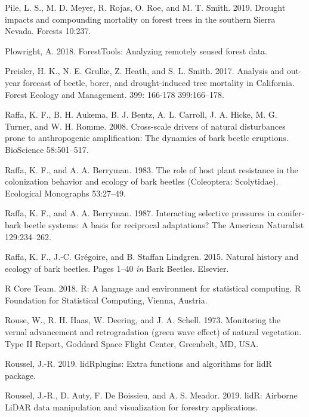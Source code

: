 \documentclass[]{article}
\begin{document}
\leavevmode\hypertarget{ref-pile2019}{}%
Pile, L. S., M. D. Meyer, R. Rojas, O. Roe, and M. T. Smith. 2019.
Drought impacts and compounding mortality on forest trees in the
southern Sierra Nevada. Forests 10:237.

\leavevmode\hypertarget{ref-plowright2018}{}%
Plowright, A. 2018. ForestTools: Analyzing remotely sensed forest data.

\leavevmode\hypertarget{ref-preisler2017}{}%
Preisler, H. K., N. E. Grulke, Z. Heath, and S. L. Smith. 2017. Analysis
and out-year forecast of beetle, borer, and drought-induced tree
mortality in California. Forest Ecology and Management. 399: 166-178
399:166--178.

\leavevmode\hypertarget{ref-raffa2008}{}%
Raffa, K. F., B. H. Aukema, B. J. Bentz, A. L. Carroll, J. A. Hicke, M.
G. Turner, and W. H. Romme. 2008. Cross-scale drivers of natural
disturbances prone to anthropogenic amplification: The dynamics of bark
beetle eruptions. BioScience 58:501--517.

\leavevmode\hypertarget{ref-raffa1983}{}%
Raffa, K. F., and A. A. Berryman. 1983. The role of host plant
resistance in the colonization behavior and ecology of bark beetles
(Coleoptera: Scolytidae). Ecological Monographs 53:27--49.

\leavevmode\hypertarget{ref-raffa1987}{}%
Raffa, K. F., and A. A. Berryman. 1987. Interacting selective pressures
in conifer-bark beetle systems: A basis for reciprocal adaptations? The
American Naturalist 129:234--262.

\leavevmode\hypertarget{ref-raffa2015}{}%
Raffa, K. F., J.-C. Grégoire, and B. Staffan Lindgren. 2015. Natural
history and ecology of bark beetles. Pages 1--40 \emph{in} Bark Beetles.
Elsevier.

\leavevmode\hypertarget{ref-rcoreteam2018}{}%
R Core Team. 2018. R: A language and environment for statistical
computing. R Foundation for Statistical Computing, Vienna, Austria.

\leavevmode\hypertarget{ref-rouse1973}{}%
Rouse, W., R. H. Haas, W. Deering, and J. A. Schell. 1973. Monitoring
the vernal advancement and retrogradation (green wave effect) of natural
vegetation. Type II Report, Goddard Space Flight Center, Greenbelt, MD,
USA.

\leavevmode\hypertarget{ref-roussel2019a}{}%
Roussel, J.-R. 2019. lidRplugins: Extra functions and algorithms for
lidR package.

\leavevmode\hypertarget{ref-roussel2019}{}%
Roussel, J.-R., D. Auty, F. De Boissieu, and A. S. Meador. 2019. lidR:
Airborne LiDAR data manipulation and visualization for forestry
applications.
\end{document}

